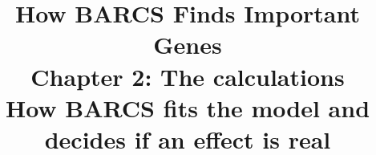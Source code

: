 \documentclass[12pt]{article}
\title{\textbf{How BARCS Finds Important Genes}\\[6pt]
\Large Chapter 2: The calculations\\[4pt]
\large How BARCS fits the model and decides if an effect is real}
\author{\guideauthor}
\date{\guidedate}
\begin{document}
\maketitle
\aboutbox
\tableofcontents
\newpage

\end{document}
